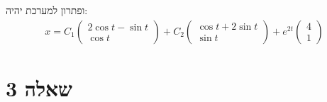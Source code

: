 \documentclass{article}
\begin{document}
ופתרון למערכת יהיה:
\begin{align*}
    x = C_1 \begin{pmatrix}
                2\cos t - \sin t \\
                \cos t
            \end{pmatrix} + C_2 \begin{pmatrix}
                                    \cos t + 2\sin t \\
                                    \sin t
                                \end{pmatrix} + e^{2t}\begin{pmatrix}
                                                          4 \\
                                                          1
                                                      \end{pmatrix}
\end{align*}

\pagebreak

\section*{שאלה 3}
\end{document}
